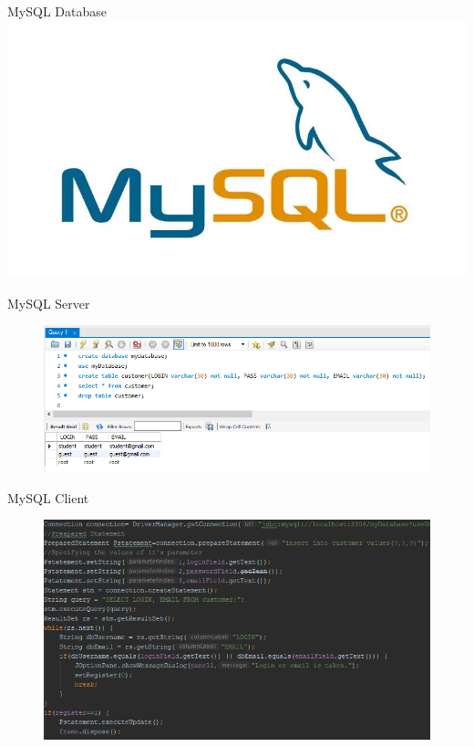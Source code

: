 \documentclass{beamer}
\begin{document}
\begin{frame}{MySQL Database}
 \includegraphics[scale=0.5]{mysql}
\end{frame}



\begin{frame}{MySQL Server}
\begin{figure}
 \includegraphics[scale=0.5]{mysql_server}
\end{figure}
\end{frame}



\begin{frame}{MySQL Client}
\begin{figure}
 \includegraphics[scale=0.5]{mysql_connection}
\end{figure}
\end{frame}
\end{document}
